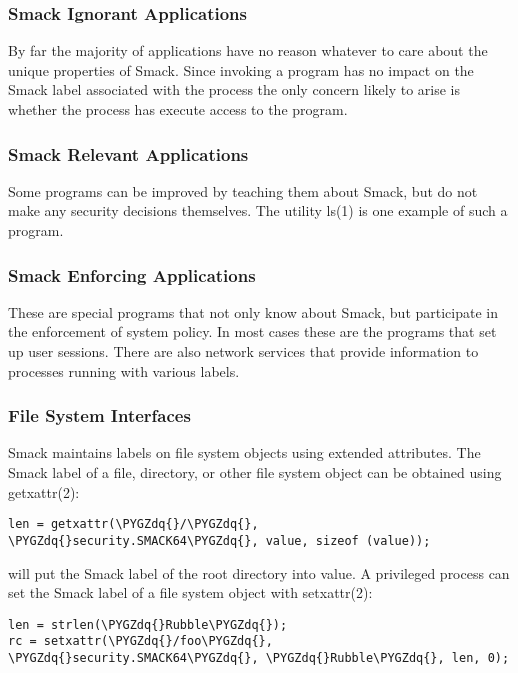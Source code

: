 \documentclass[a4paper,8pt,english]{sphinxmanual}
\def\PYGZdq{\char`\"}
\begin{document}
\subsubsection{Smack Ignorant Applications}
\label{admin-guide/LSM/Smack:smack-ignorant-applications}
By far the majority of applications have no reason whatever to care about the
unique properties of Smack. Since invoking a program has no impact on the
Smack label associated with the process the only concern likely to arise is
whether the process has execute access to the program.


\subsubsection{Smack Relevant Applications}
\label{admin-guide/LSM/Smack:smack-relevant-applications}
Some programs can be improved by teaching them about Smack, but do not make
any security decisions themselves. The utility ls(1) is one example of such a
program.


\subsubsection{Smack Enforcing Applications}
\label{admin-guide/LSM/Smack:smack-enforcing-applications}
These are special programs that not only know about Smack, but participate in
the enforcement of system policy. In most cases these are the programs that
set up user sessions. There are also network services that provide information
to processes running with various labels.


\subsubsection{File System Interfaces}
\label{admin-guide/LSM/Smack:file-system-interfaces}
Smack maintains labels on file system objects using extended attributes. The
Smack label of a file, directory, or other file system object can be obtained
using getxattr(2):

\begin{Verbatim}[commandchars=\\\{\}]
len = getxattr(\PYGZdq{}/\PYGZdq{}, \PYGZdq{}security.SMACK64\PYGZdq{}, value, sizeof (value));
\end{Verbatim}

will put the Smack label of the root directory into value. A privileged
process can set the Smack label of a file system object with setxattr(2):

\begin{Verbatim}[commandchars=\\\{\}]
len = strlen(\PYGZdq{}Rubble\PYGZdq{});
rc = setxattr(\PYGZdq{}/foo\PYGZdq{}, \PYGZdq{}security.SMACK64\PYGZdq{}, \PYGZdq{}Rubble\PYGZdq{}, len, 0);
\end{Verbatim}
\end{document}
